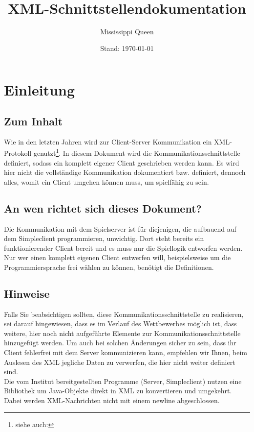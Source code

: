 \documentclass[12pt,a4paper, ngerman, oneside]{scrartcl}
\title{XML-Schnittstellendokumentation}
\subtitle{Mississippi Queen}
\date{Stand: \today}
\begin{document}
\maketitle
\thispagestyle{empty}
\tableofcontents
\thispagestyle{empty}
\newpage
\setcounter{page}{1}
\section{Einleitung}
\subsection*{Zum Inhalt} Wie in den letzten Jahren wird zur Client-Server
Kommunikation ein XML-Protokoll genutzt\footnote{siehe auch:
}. In diesem
Dokument wird die Kommunikationsschnittstelle definiert, sodass ein komplett
eigener Client geschrieben werden kann. Es wird hier nicht die vollständige
Kommunikation dokumentiert bzw. definiert, dennoch alles, womit ein Client
umgehen können muss, um spielfähig zu sein.
\subsection*{An wen richtet sich dieses Dokument?} Die Kommunikation mit dem
Spielserver ist für diejenigen, die aufbauend auf dem Simpleclient
programmieren, unwichtig. Dort steht bereits ein funktionierender Client bereit
und es muss nur die Spiellogik entworfen werden. \\
Nur wer einen komplett eigenen Client entwerfen will, beispielsweise um die
Programmiersprache frei wählen zu können, benötigt die Definitionen.

\subsection*{Hinweise} Falls Sie beabsichtigen sollten, diese
Kommunikationsschnittstelle zu realisieren, sei darauf hingewiesen, dass es im
Verlauf des Wettbewerbes möglich ist, dass weitere, hier noch nicht aufgeführte
Elemente zur Kommunikationsschnittstelle hinzugefügt werden. Um auch bei
solchen Änderungen sicher zu sein, dass ihr Client fehlerfrei mit dem Server
kommunizieren kann, empfehlen wir Ihnen, beim Auslesen des XML jegliche Daten zu
verwerfen, die hier nicht weiter definiert sind. \bigskip \\
Die vom Institut bereitgestellten Programme (Server, Simpleclient) nutzen eine
Bibliothek um Java-Objekte direkt in XML zu konvertieren und umgekehrt.
Dabei werden XML-Nachrichten nicht mit einem newline abgeschlossen.
\end{document}
